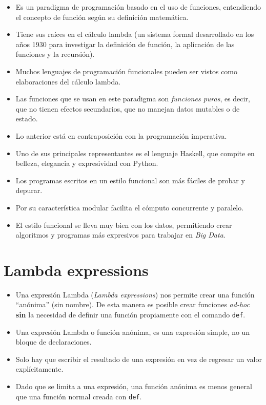\documentclass[
  spanish,
  letterpaper,
]{scrbook}
\theoremstyle{definition}
\theoremstyle{remark}
\begin{document}
\begin{itemize}
\item
  Es un paradigma de programación basado en el uso de funciones,
  entendiendo el concepto de función según su definición matemática.
\item
  Tiene sus raíces en el cálculo lambda (un sistema formal desarrollado
  en los años 1930 para investigar la definición de función, la
  aplicación de las funciones y la recursión).
\item
  Muchos lenguajes de programación funcionales pueden ser vistos como
  elaboraciones del cálculo lambda.
\item
  Las funciones que se usan en este paradigma son \emph{funciones
  puras}, es decir, que no tienen efectos secundarios, que no manejan
  datos mutables o de estado.
\item
  Lo anterior está en contraposición con la programación imperativa.
\item
  Uno de sus principales representantes es el lenguaje Haskell, que
  compite en belleza, elegancia y expresividad con Python.
\item
  Los programas escritos en un estilo funcional son más fáciles de
  probar y depurar.
\item
  Por su característica modular facilita el cómputo concurrente y
  paralelo.
\item
  El estilo funcional se lleva muy bien con los datos, permitiendo crear
  algoritmos y programas más expresivos para trabajar en \emph{Big
  Data}.
\end{itemize}

\section{Lambda expressions}\label{lambda-expressions}

\begin{itemize}
\item
  Una expresión Lambda (\emph{Lambda expressions}) nos permite crear una
  función ``anónima'' (sin nombre). De esta manera es posible crear
  funciones \emph{ad-hoc} \textbf{sin} la necesidad de definir una
  función propiamente con el comando \texttt{def}.
\item
  Una expresión Lambda o función anónima, es una expresión simple, no un
  bloque de declaraciones.
\item
  Solo hay que escribir el resultado de una expresión en vez de regresar
  un valor explícitamente.
\item
  Dado que se limita a una expresión, una función anónima es menos
  general que una función normal creada con \texttt{def}.
\end{itemize}
\end{document}
